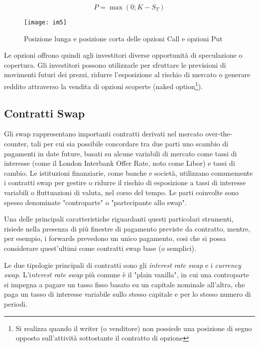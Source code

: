 \documentclass[12pt,a4paper]{report}
\begin{document}
\begin{equation}
    P = \max ( 0; K - S_T)
\end{equation}

\begin{figure}
     [ht]
    \centering
    \texttt{[image: im5]}
    \caption{Posizione lunga e posizione corta delle opzioni Call e opzioni Put }
    \label{fig:enter-label1}
\end{figure}


Le opzioni offrono quindi agli investitori diverse opportunità di speculazione o copertura. Gli investitori possono utilizzarle per sfruttare le previsioni di movimenti futuri dei prezzi, ridurre l'esposizione al rischio di mercato o generare reddito attraverso la vendita di opzioni scoperte (naked option\footnote{Si realizza quando il writer (o venditore) non possiede una posizione di segno opposto sull'attività sottostante il contratto di opzione}).


\subsection{Contratti Swap}

Gli swap rappresentano importanti contratti derivati nel mercato over-the-counter, tali per cui sia possibile concordare tra due parti uno scambio di pagamenti in date future, basati su alcune variabili di mercato come tassi di interesse (come il London Interbank Offer Rate, noto come Libor) e tassi di cambio.
Le istituzioni finanziarie, come banche e società, utilizzano comunemente i contratti swap per gestire o ridurre il rischio di esposizione a tassi di interesse variabili o fluttuazioni di valuta, nel corso del tempo. Le parti coinvolte sono spesso denominate "controparte" o "partecipante allo swap".

Una delle principali caratteristiche riguardanti questi particolari strumenti, risiede nella presenza di più finestre di pagamento previste da contratto, mentre, per esempio, i forwards prevedono un unico pagamento, cosi che si possa considerare quest'ultimi come contratti swap base (o semplici).

Le due tipologie principali di contratti sono gli \textit{interest rate swap} e i \textit{currency swap}. L'i\textit{nterest rate swap} più comune è il "plain vanilla", in cui una controparte si impegna a pagare un tasso fisso basato su un capitale nominale all'altra, che paga un tasso di interesse variabile sullo stesso capitale e per lo stesso numero di periodi.
\end{document}
